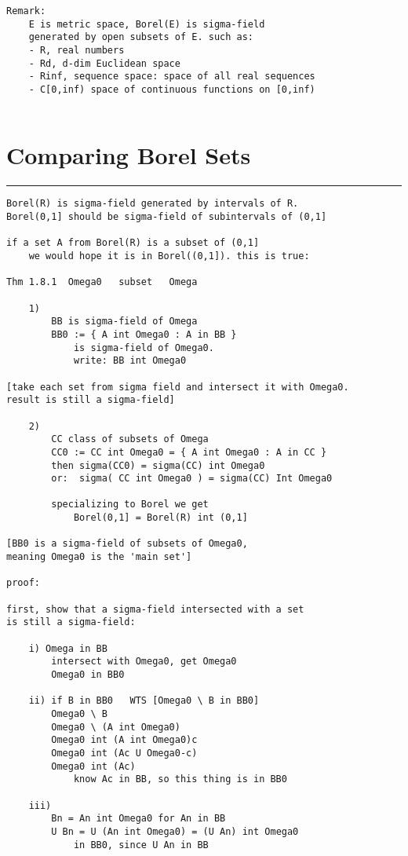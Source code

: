 \documentclass{article}
\begin{document}
\begin{flushleft}
\begin{verbatim}
Remark:
    E is metric space, Borel(E) is sigma-field 
    generated by open subsets of E. such as:
    - R, real numbers
    - Rd, d-dim Euclidean space
    - Rinf, sequence space: space of all real sequences
    - C[0,inf) space of continuous functions on [0,inf)
        
\end{verbatim}

\section*{Comparing Borel Sets}
\bigbreak
\hrule
\bigbreak


\begin{verbatim}
Borel(R) is sigma-field generated by intervals of R.
Borel(0,1] should be sigma-field of subintervals of (0,1]

if a set A from Borel(R) is a subset of (0,1] 
    we would hope it is in Borel((0,1]). this is true:

Thm 1.8.1  Omega0   subset   Omega

    1) 
        BB is sigma-field of Omega
        BB0 := { A int Omega0 : A in BB } 
            is sigma-field of Omega0.
            write: BB int Omega0 

[take each set from sigma field and intersect it with Omega0. 
result is still a sigma-field]

    2) 
        CC class of subsets of Omega
        CC0 := CC int Omega0 = { A int Omega0 : A in CC }
        then sigma(CC0) = sigma(CC) int Omega0
        or:  sigma( CC int Omega0 ) = sigma(CC) Int Omega0

        specializing to Borel we get
            Borel(0,1] = Borel(R) int (0,1]

[BB0 is a sigma-field of subsets of Omega0, 
meaning Omega0 is the 'main set']

proof:

first, show that a sigma-field intersected with a set
is still a sigma-field:

    i) Omega in BB
        intersect with Omega0, get Omega0
        Omega0 in BB0

    ii) if B in BB0   WTS [Omega0 \ B in BB0] 
        Omega0 \ B
        Omega0 \ (A int Omega0)
        Omega0 int (A int Omega0)c
        Omega0 int (Ac U Omega0-c)
        Omega0 int (Ac)    
            know Ac in BB, so this thing is in BB0

    iii) 
        Bn = An int Omega0 for An in BB
        U Bn = U (An int Omega0) = (U An) int Omega0   
            in BB0, since U An in BB


\end{verbatim}
\end{flushleft}
\end{document}
